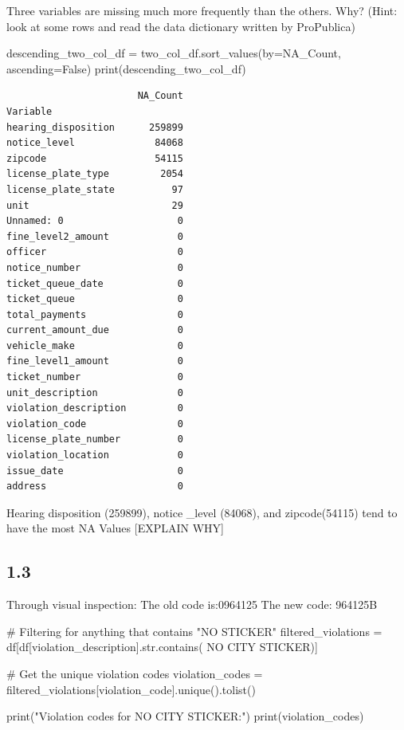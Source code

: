 \documentclass[
  letterpaper,
  DIV=11,
  numbers=noendperiod]{scrartcl}
\newenvironment{Shaded}{\begin{snugshade}}{\end{snugshade}}
\newcommand{\BuiltInTok}[1]{\textcolor[rgb]{0.00,0.23,0.31}{#1}}
\newcommand{\CommentTok}[1]{\textcolor[rgb]{0.37,0.37,0.37}{#1}}
\newcommand{\NormalTok}[1]{\textcolor[rgb]{0.00,0.23,0.31}{#1}}
\newcommand{\OperatorTok}[1]{\textcolor[rgb]{0.37,0.37,0.37}{#1}}
\newcommand{\StringTok}[1]{\textcolor[rgb]{0.13,0.47,0.30}{#1}}
\newcommand{\VariableTok}[1]{\textcolor[rgb]{0.07,0.07,0.07}{#1}}
\begin{document}
Three variables are missing much more frequently than the others. Why?
(Hint: look at some rows and read the data dictionary written by
ProPublica)

\begin{Shaded}
\begin{Highlighting}[]
\NormalTok{descending\_two\_col\_df }\OperatorTok{=}\NormalTok{ two\_col\_df.sort\_values(by}\OperatorTok{=}\StringTok{\textquotesingle{}NA\_Count\textquotesingle{}}\NormalTok{, ascending}\OperatorTok{=}\VariableTok{False}\NormalTok{)}
\BuiltInTok{print}\NormalTok{(descending\_two\_col\_df)}
\end{Highlighting}
\end{Shaded}

\begin{verbatim}
                       NA_Count
Variable                       
hearing_disposition      259899
notice_level              84068
zipcode                   54115
license_plate_type         2054
license_plate_state          97
unit                         29
Unnamed: 0                    0
fine_level2_amount            0
officer                       0
notice_number                 0
ticket_queue_date             0
ticket_queue                  0
total_payments                0
current_amount_due            0
vehicle_make                  0
fine_level1_amount            0
ticket_number                 0
unit_description              0
violation_description         0
violation_code                0
license_plate_number          0
violation_location            0
issue_date                    0
address                       0
\end{verbatim}

Hearing disposition (259899), notice \_level (84068), and zipcode(54115)
tend to have the most NA Values {[}EXPLAIN WHY{]}

\subsection{1.3}\label{section-2}

Through visual inspection: The old code is:0964125 The new code: 964125B

\begin{Shaded}
\begin{Highlighting}[]
\CommentTok{\# Filtering for anything that contains "NO STICKER"}
\NormalTok{filtered\_violations }\OperatorTok{=}\NormalTok{ df[df[}\StringTok{\textquotesingle{}violation\_description\textquotesingle{}}\NormalTok{].}\BuiltInTok{str}\NormalTok{.contains(}
    \StringTok{\textquotesingle{}NO CITY STICKER\textquotesingle{}}\NormalTok{)]}

\CommentTok{\# Get the unique violation codes}
\NormalTok{violation\_codes }\OperatorTok{=}\NormalTok{ filtered\_violations[}\StringTok{\textquotesingle{}violation\_code\textquotesingle{}}\NormalTok{].unique().tolist()}

\BuiltInTok{print}\NormalTok{(}\StringTok{"Violation codes for \textquotesingle{}NO CITY STICKER\textquotesingle{}:"}\NormalTok{)}
\BuiltInTok{print}\NormalTok{(violation\_codes)}
\end{Highlighting}
\end{Shaded}
\end{document}
